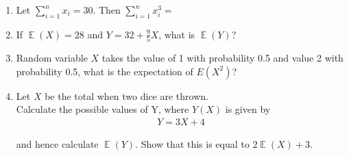 \documentclass[12pt]{article}
\begin{document}
\begin{enumerate}[1)]

\item Let $\sum_{i=1}^{n} x_i = 30$. Then $\sum_{i=1}^{n} x_i^3 = $

\bigskip

\bigskip

\bigskip

\bigskip

\item If $\mathop{\mathbb{E}}\left(X\right) = 28$ and $Y = 32 + \frac{9}{5}X$, what is $\mathop{\mathbb{E}}(Y)$?

\bigskip

\bigskip

\bigskip

\bigskip

\item Random variable $X$ takes the value of 1 with probability 0.5 and value 2 with probability 0.5, what is the expectation of $E(X^2)$?

\bigskip

\bigskip

\bigskip

\bigskip

\newpage

\item Let $X$ be the total when two dice are thrown.\\ Calculate the possible values of Y, where $Y(X)$ is given by
\begin{align*}
Y = 3X + 4
\end{align*}

and hence calculate $\mathop{\mathbb{E}}(Y)$. Show that this is equal to $2\mathop{\mathbb{E}}(X)+3$.

\bigskip

\bigskip

\bigskip

\bigskip

\bigskip

\bigskip

\bigskip

\bigskip

\bigskip

\bigskip

\bigskip

\bigskip

\bigskip

\bigskip

\bigskip

\bigskip


\end{enumerate}
\end{document}
